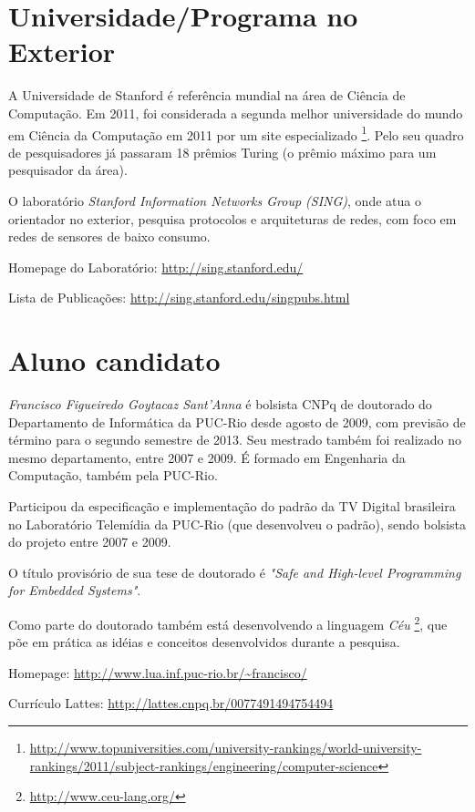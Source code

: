 \documentclass[11pt,a4paper]{report}
\begin{document}
\section{Universidade/Programa no Exterior}

A Universidade de Stanford é referência mundial na área de Ciência de 
Computação.
Em 2011, foi considerada a segunda melhor universidade do mundo em Ciência da 
Computação em 2011 por um site especializado%
\footnote{\url{http://www.topuniversities.com/university-rankings/world-university-rankings/2011/subject-rankings/engineering/computer-science}}.
Pelo seu quadro de pesquisadores já passaram 18 prêmios Turing (o prêmio máximo 
para um pesquisador da área).

O laboratório \emph{Stanford Information Networks Group (SING)}, onde atua o 
orientador no exterior, pesquisa protocolos e arquiteturas de redes, com foco 
em redes de sensores de baixo consumo.

Homepage do Laboratório:
\url{http://sing.stanford.edu/}

Lista de Publicações:
\url{http://sing.stanford.edu/singpubs.html}


\section{Aluno candidato}

\emph{Francisco Figueiredo Goytacaz Sant'Anna} é bolsista CNPq de doutorado do 
Departamento de Informática da PUC-Rio desde agosto de 2009, com previsão de 
término para o segundo semestre de 2013.
Seu mestrado também foi realizado no mesmo departamento, entre 2007 e 2009.
É formado em Engenharia da Computação, também pela PUC-Rio.

Participou da especificação e implementação do padrão da TV Digital brasileira 
\cite{} no Laboratório Telemídia da PUC-Rio (que desenvolveu o padrão), sendo 
bolsista do projeto entre 2007 e 2009.

O título provisório de sua tese de doutorado é
\emph{"Safe and High-level Programming for Embedded Systems"}.

Como parte do doutorado também está desenvolvendo a linguagem \emph{Céu}%
\footnote{\url{http://www.ceu-lang.org/}},
que põe em prática as idéias e conceitos desenvolvidos durante a pesquisa.

Homepage: \url{http://www.lua.inf.puc-rio.br/~francisco/}

Currículo Lattes: \url{http://lattes.cnpq.br/0077491494754494}
\end{document}
